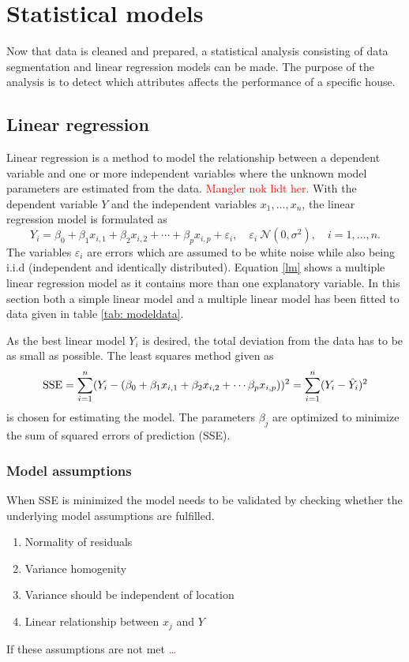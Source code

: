 \chapter{Statistical models}
Now that data is cleaned and prepared, a statistical analysis consisting of data segmentation and linear regression models can be made. The purpose of the analysis is to detect which attributes affects the performance of a specific house.

\section{Linear regression}
Linear regression is a method to model the relationship between a dependent variable and one or more independent variables where the unknown model parameters are estimated from the data. \textcolor{red}{Mangler nok lidt her.} With the dependent variable $Y$ and the independent variables $x_1, \dots, x_n$, the linear regression model is formulated as
\begin{equation}
    Y_i = \beta_0 + \beta_1 x_{i,1} + \beta_2 x_{i,2} + \cdots + \beta_p x_{i,p} + \varepsilon_i, \quad \varepsilon_i ~ \mathcal{N}(0,\sigma^2), \quad i = 1,\dots, n. \label{lm}
\end{equation}
The variables $\varepsilon_i$ are errors which are assumed to be white noise while also being i.i.d (independent and identically distributed). Equation \eqref{lm} shows a multiple linear regression model as it contains more than one explanatory variable. In this section both a simple linear model and a multiple linear model has been fitted to data given in table \ref{tab: modeldata}.

\noindent As the best linear model $Y_i$ is desired, the total deviation from the data has to be as small as possible. The least squares method given as
\begin{equation}
    \text{SSE} = \sum_{i=1}^n (Y_i - (\beta_0 + \beta_1 x_{i,1} + \beta_2 x_{i,2} + \cdots  \beta_p x_{i,p}))^2 = \sum_{i=1}^n (Y_i - \Hat{Y}_i)^2
\end{equation}
is chosen for estimating the model. The parameters $\beta_j$ are optimized to minimize the sum of squared errors of prediction (SSE).

\subsection{Model assumptions}
\noindent When SSE is minimized the model needs to be validated by checking whether the underlying model assumptions are fulfilled.
\begin{enumerate} [label=\textbf{\arabic*}]
    \item Normality of residuals
    \item Variance homogenity
    \item Variance should be independent of location
    \item Linear relationship between $x_j$ and $Y$
\end{enumerate}
If these assumptions are not met \textcolor{red}{\dots} \\

